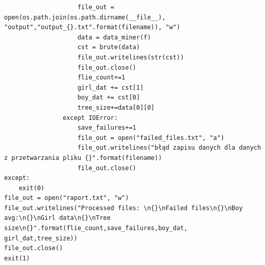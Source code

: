 \documentclass[12pt,a4paper]{article}
\begin{document}
\begin{lstlisting}
                    file_out = open(os.path.join(os.path.dirname(__file__), "output","output_{}.txt".format(filename)), "w")
                    data = data_miner(f)
                    cst = brute(data)
                    file_out.writelines(str(cst))
                    file_out.close()
                    flie_count+=1
                    girl_dat += cst[1]
                    boy_dat += cst[0]
                    tree_size+=data[0][0]
                except IOError:
                    save_failures+=1
                    file_out = open("failed_files.txt", "a")
                    file_out.writelines("błąd zapisu danych dla danych z przetwarzania pliku {}".format(filename))
                    file_out.close()
except:
    exit(0)
file_out = open("raport.txt", "w")
file_out.writelines("Processed files: \n{}\nFailed files\n{}\nBoy avg:\n{}\nGirl data\n{}\nTree size\n{}".format(flie_count,save_failures,boy_dat, girl_dat,tree_size))
file_out.close()
exit(1)

	\end{lstlisting}
	
	
	
	
	
\end{document}
